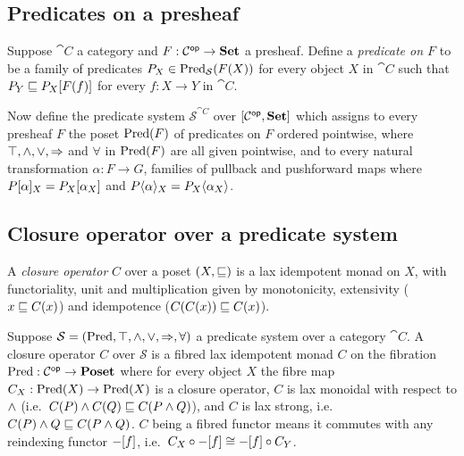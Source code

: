 \subsection{Predicates on a presheaf}

Suppose $\cat{C}$ a category and $F: \mathcal{C}^{\mathsf{op}} \to \mathbf{Set}$ a presheaf. Define a \emph{predicate on $F$} to be
a family of predicates $P_X \in \mathrm{Pred}_\mathcal{S}(F(X))$ for every object $X$ in $\cat{C}$ such that $P_Y
\sqsubseteq P_X[F(f)]$ for every $f: X \to Y$ in $\cat{C}$.

Now define the predicate system $\mathcal{S}^{\cat{C}}$ over $[\mathcal{C}^{\mathsf{op}},\mathbf{Set}]$ which assigns to every
presheaf $F$ the poset $\mathrm{Pred}(F)$ of predicates on $F$ ordered pointwise, where $\top, \wedge, \vee,
\Rightarrow$ and $\forall$ in $\mathrm{Pred}(F)$ are all given pointwise, and to every natural transformation $\alpha: F
\to G$, families of pullback and pushforward maps where $P[\alpha]_X = P_X[\alpha_X]$ and
$P\langle\alpha\rangle_X = P_X\langle\alpha_X\rangle$.

\subsection{Closure operator over a predicate system}

A \emph{closure operator} $C$ over a poset $(X, \sqsubseteq)$ is a lax idempotent monad on $X$, with functoriality,
unit and multiplication given by monotonicity, extensivity ($x \sqsubseteq C(x)$) and idempotence ($C(C(x)) \sqsubseteq
C(x)$).

Suppose $\mathcal{S} = (\mathrm{Pred}, \top, \wedge, \vee, \Rightarrow, \forall)$ a predicate system over a category
$\cat{C}$. A closure operator $C$ over $\mathcal{S}$ is a fibred lax idempotent monad $C$ on the fibration
$\mathrm{Pred}: \mathcal{C}^{\mathsf{op}} \to \mathbf{Poset}$ where for every object $X$ the fibre map $C_X: \mathrm{Pred}(X) \to \mathrm{Pred}(X)$ is a
closure operator, $C$ is lax monoidal with respect to $\wedge$ (i.e.~$C(P) \wedge C(Q) \sqsubseteq C(P \wedge Q)$),
and $C$ is lax strong, i.e.~$C(P) \wedge Q \sqsubseteq C(P \wedge Q)$. $C$ being a fibred functor means it commutes
with any reindexing functor $-[f]$, i.e.~$C_X \circ -[f] \cong -[f] \circ C_Y$.

%
%
